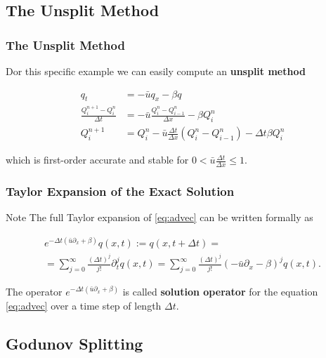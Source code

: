 \documentclass{beamer}
\renewcommand{\d}{\Delta}
\renewcommand{\emph}[1]{\textcolor{tum}{\textbf{#1}}}
\begin{document}
\subsection{The Unsplit Method}

\begin{frame}
	\frametitle{The Unsplit Method}
	Dor this specific example we can easily compute an \emph{unsplit method}

	\begin{align*}\label{eq:unsplit}
		q_t                          & = -\bar{u}q_x-\beta q                                              \\
		\frac{Q^{n+1}_i-Q^n_i}{\d t} & = -\bar{u} \frac{Q^n_i-Q^n_{i-1}}{\d x}-\beta Q^n_i                \\
		Q^{n+1}_i                    & = Q^n_i-\bar{u} \frac{\d t}{\d x}(Q^n_i-Q^n_{i-1})-\d t\beta Q^n_i
	\end{align*}

	which is first-order accurate and stable for $0<\bar{u}\frac{\d t}{\d x}\leq1$.
\end{frame}

\begin{frame}
	\frametitle{Taylor Expansion of the Exact Solution}
	\begin{block}{Note}
		The full Taylor expansion of \eqref{eq:advec} can be written formally as

		\begin{equation}\label{eq:sol_op}
			\begin{gathered}
				e^{-\d t(\bar{u}\partial_x+\beta)}q(x,t):=q(x,t+\d t)=\\
				=\sum_{j=0}^{\infty}\frac{(\d t)^j}{j!}\partial_t^jq(x,t)=\sum_{j=0}^{\infty}\frac{(\d t)^j}{j!}(-\bar{u}\partial_x-\beta)^jq(x,t).
			\end{gathered}
		\end{equation}

		The operator $e^{-\d t(\bar{u}\partial_x+\beta)}$ is called \emph{solution operator} for the equation \eqref{eq:advec} over a time step of length $\d t$.
	\end{block}
\end{frame}












\subsection{Godunov Splitting}
\end{document}
